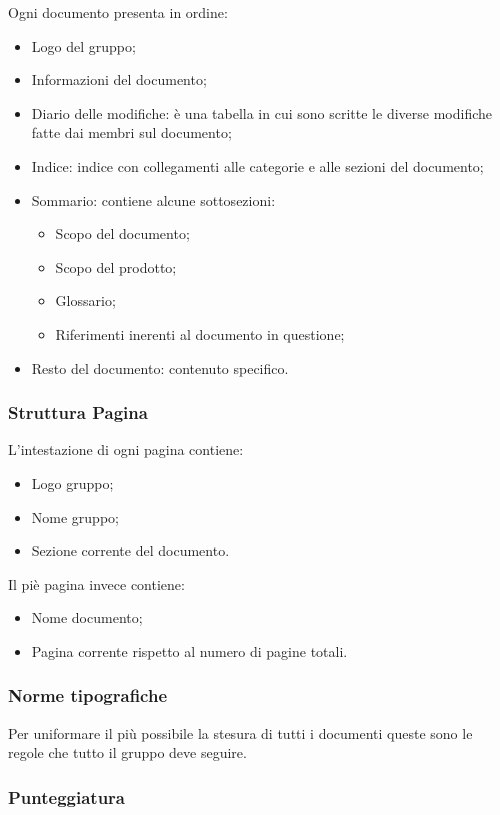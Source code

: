 \documentclass{scalatekids-article}
\begin{document}
Ogni documento presenta in ordine:
\begin{itemize}
    \item Logo del gruppo;
    \item Informazioni del documento;
    \item Diario delle modifiche: è una tabella in cui sono scritte le diverse modifiche fatte dai membri sul documento;
    \item Indice: indice con collegamenti alle categorie e alle sezioni del documento;
    \item Sommario: contiene alcune sottosezioni:
        \begin{itemize}
            \item Scopo del documento;
            \item Scopo del prodotto;
            \item Glossario;
            \item Riferimenti inerenti al documento in questione;
        \end{itemize}
    \item Resto del documento: contenuto specifico.
\end{itemize}

\subsubsection{Struttura Pagina}

L'intestazione di ogni pagina contiene:
\begin{itemize}
    \item Logo gruppo;
    \item Nome gruppo;
    \item Sezione corrente del documento.
\end{itemize}
Il piè pagina invece contiene:
\begin{itemize}
    \item Nome documento;
    \item Pagina corrente rispetto al numero di pagine totali.
\end{itemize}

\subsubsection{Norme tipografiche}

Per uniformare il più possibile la stesura di tutti i documenti queste sono le regole che tutto il gruppo deve seguire.

\subsubsection{Punteggiatura}
\end{document}
